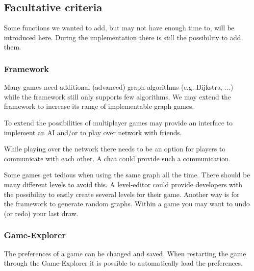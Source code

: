 \subsection{Facultative criteria}\label{REF:FACULTATIVE-CRITERIA}
Some functions we wanted to add, but may not have enough time to, will be introduced here. During the implementation there is still the possibility to add them.

\subsubsection{Framework}
Many \glspl{game} need additional (advanced) \gls{graph} \glspl{algorithm} (e.g. Dijkstra, ...)	while the \gls{framework} still only supports few algorithms. We may extend the framework to increase its range of implementable graph games. \par
To extend the possibilities of multiplayer games {\graphioli} may provide an interface to implement an \gls{AI} and/or to play over network with friends. \par
While playing over the network there needs to be an option for players to communicate with each other. A \gls{chat} could provide such a communication. \par
Some games get tedious when using the same graph all the time. There should be many different \glspl{level} to avoid this. A \gls{level-editor} could provide \glspl{developer} with the possibility to easily create several levels for their game. Another way is for the framework to generate random graphs.
Within a game you may want to \gls{undo} (or \gls{redo}) your last draw.

\subsubsection{Game-Explorer}
The preferences of a game can be changed and saved. When restarting the game through the Game-Explorer it is possible to automatically load the preferences. \\

